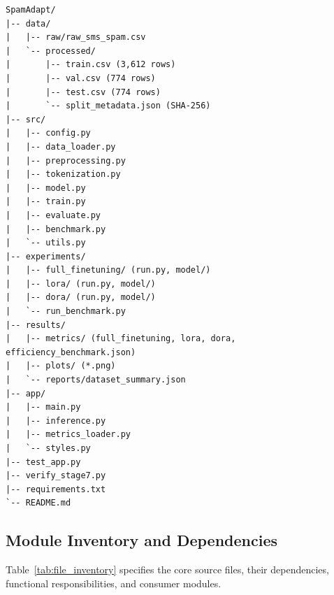 \documentclass[conference]{IEEEtran}
\begin{document}
\begin{lstlisting}[caption={Verified Directory Structure of the SpamAdapt Project}, label={lst:tree}]
SpamAdapt/
|-- data/
|   |-- raw/raw_sms_spam.csv
|   `-- processed/
|       |-- train.csv (3,612 rows)
|       |-- val.csv (774 rows)
|       |-- test.csv (774 rows)
|       `-- split_metadata.json (SHA-256)
|-- src/
|   |-- config.py
|   |-- data_loader.py
|   |-- preprocessing.py
|   |-- tokenization.py
|   |-- model.py
|   |-- train.py
|   |-- evaluate.py
|   |-- benchmark.py
|   `-- utils.py
|-- experiments/
|   |-- full_finetuning/ (run.py, model/)
|   |-- lora/ (run.py, model/)
|   |-- dora/ (run.py, model/)
|   `-- run_benchmark.py
|-- results/
|   |-- metrics/ (full_finetuning, lora, dora, efficiency_benchmark.json)
|   |-- plots/ (*.png)
|   `-- reports/dataset_summary.json
|-- app/
|   |-- main.py
|   |-- inference.py
|   |-- metrics_loader.py
|   `-- styles.py
|-- test_app.py
|-- verify_stage7.py
|-- requirements.txt
`-- README.md
\end{lstlisting}

\subsection{Module Inventory and Dependencies}
Table~\ref{tab:file_inventory} specifies the core source files, their dependencies, functional responsibilities, and consumer modules.
\end{document}

